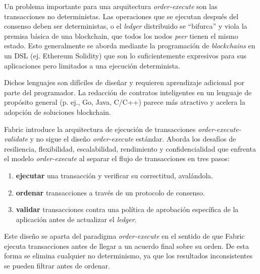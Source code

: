 
Un problema importante para una arquitectura \textit{order-execute} son las transacciones no deterministas. Las operaciones que se ejecutan después del consenso deben ser deterministas, o el \textit{ledger} distribuido se “bifurca” y viola la premisa básica de una blockchain, que todos los nodos \textit{peer} tienen el mismo estado. Esto generalmente se aborda mediante la programación de \textit{blockchains} en un DSL (ej. Ethereum Solidity) que son lo suficientemente expresivos para sus aplicaciones pero limitados a una ejecución determinista.

Dichos lenguajes son difíciles de diseñar y requieren
aprendizaje adicional por parte del programador. La redacción de contratos inteligentes en un lenguaje de propósito general (p. ej., Go, Java, C/C++) parece más atractivo y acelera la adopción de soluciones blockchain.


Fabric introduce la arquitectura de ejecución de transacciones \textit{order-execute-validate} y no sigue el diseño \textit{order-execute} estándar. Aborda los desafíos de resiliencia, flexibilidad, escalabilidad, rendimiento y confidencialidad que enfrenta el modelo \textit{order-execute} al separar el flujo de transacciones en tres pasos:
\begin{enumerate}
 \item \textbf{ejecutar} una transacción y verificar su correctitud, avalándola.
 \item \textbf{ordenar} transacciones a través de un protocolo de consenso.
   \item \textbf{validar} transacciones contra una política de aprobación específica de la aplicación antes de actualizar el \textit{ledger}.
\end{enumerate}

Este diseño se aparta del paradigma \textit{order-execute} en el sentido de que Fabric ejecuta transacciones antes de llegar a un acuerdo final sobre su orden. De esta forma se elimina cualquier no determinismo, ya que los resultados inconsistentes se pueden filtrar antes de ordenar.

